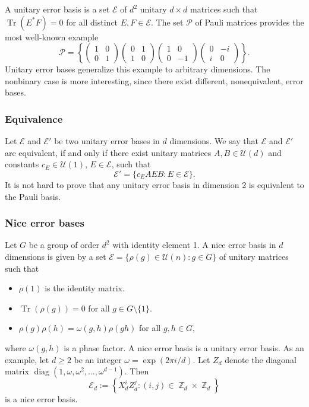 \documentclass[a4paper]{article}
\DeclareMathOperator{\Z}{\mathbb{Z}}
\DeclareMathOperator{\Tr}{Tr}
\DeclareMathOperator{\diag}{diag}
\begin{document}
  A unitary error basis is a set $\mathcal E$ of $d^2$ 
  unitary $d \times d$ matrices such that $\Tr(E^*F) = 0$ 
  for all distinct $E,F \in \mathcal E$. The set $\mathcal
  P$ of Pauli matrices provides the most well-known example
  \[
    \mathcal P
    = \left\{
      \begin{pmatrix} 1 & 0\\ 0 & 1 \end{pmatrix} 
      \begin{pmatrix} 0 & 1\\ 1 & 0 \end{pmatrix} 
      \begin{pmatrix} 1 & 0\\ 0 & -1 \end{pmatrix} 
      \begin{pmatrix} 0 & -i\\ i & 0 \end{pmatrix} 
    \right\}.
  \] 
  Unitary error bases generalize this example to arbitrary
  dimensions. The nonbinary case is more interesting, since
  there exist different, nonequivalent, error bases. 

  \subsubsection{Equivalence}

  Let $\mathcal E$ and $\mathcal E'$ be two unitary error
  bases in $d$ dimensions. We say that $\mathcal E$ and
  $\mathcal E'$ are equivalent, if and only if there exist
  unitary matrices $A, B \in \mathcal U(d)$ and constants
  $c_E \in \mathcal U(1)$, $E \in \mathcal E$, such that
  \[
    \mathcal E'
    = \{c_E AEB : E \in \mathcal E\}.
  \] 
  It is not hard to prove that any unitary error basis in
  dimension 2 is equivalent to the Pauli basis.

  \subsubsection{Nice error bases}

  Let $G$ be a group of order $d^2$ with identity element 1.
  A nice error basis in $d$ dimensions is given by a set
  $\mathcal E = \{\rho(g) \in \mathcal U(n) : g \in G\}$ of
  unitary matrices such that
  \begin{itemize}
    \item $\rho(1)$ is the identity matrix.
    \item $\Tr(\rho(g)) = 0$ for all $g \in G \setminus
      \{1\}$.
    \item $\rho(g)\rho(h) = \omega(g,h)\rho(gh)$ for all
      $g,h \in G$,
  \end{itemize}
  where $\omega(g,h)$ is a phase factor. A nice error basis
  is a unitary error basis. As an example, let $d \geq 2$ be
  an integer $\omega = \exp(2\pi i / d)$. Let $Z_d$ denote
  the diagonal matrix
  $\diag(1,\omega,\omega^2,\ldots,\omega^{d-1})$. Then
  \[
    \mathcal E_d
    := \left\{
      X^i_d Z^j_d : (i,j) \in \Z_d \times \Z_d
    \right\}
  \] 
  is a nice error basis.
\end{document}
